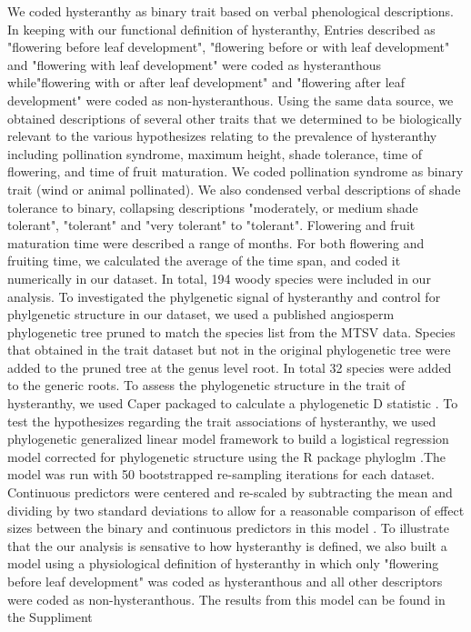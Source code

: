 \documentclass{article}\usepackage[]{graphicx}\usepackage[]{color}
\begin{document}
We coded hysteranthy as binary trait based on verbal phenological descriptions. In keeping with our functional definition of hysteranthy, Entries described as "flowering before leaf development", "flowering before or with leaf development" and "flowering with leaf development" were coded as hysteranthous while"flowering with or after leaf development" and "flowering after leaf development" were coded as non-hysteranthous. Using the same data source, we obtained descriptions of several other traits that we determined to be biologically relevant to the various hypothesizes relating to the prevalence of hysteranthy including pollination syndrome, maximum height, shade tolerance, time of flowering, and time of fruit maturation. We coded pollination syndrome as binary trait (wind or animal pollinated). We also condensed verbal descriptions of shade tolerance to binary, collapsing descriptions "moderately, or medium shade tolerant", "tolerant" and "very tolerant" to "tolerant". Flowering and fruit maturation time were described a range of months. For both flowering and fruiting time, we calculated the average of the time span, and coded it numerically in our dataset. In total, 194 woody species were included in our analysis. To investigated the phylgenetic signal of hysteranthy and control for phylgenetic structure in our dataset, we used a published angiosperm phylogenetic tree \citep{Zanne2014} pruned to match the species list from the MTSV data. Species that obtained in the trait dataset but not in the original phylogenetic tree were added to the pruned tree at the genus level root. In total 32 species were added to the generic roots. To assess the phylogenetic structure in the trait of hysteranthy, we used Caper packaged \citep{} to calculate a phylogenetic D statistic \citep{Fritz2010}. To test the hypothesizes regarding the trait associations of hysteranthy, we used phylogenetic generalized linear model framework \citep{Ives2010} to build a logistical regression model corrected for phylogenetic structure using the R package phyloglm \citep{}.The model was run with 50 bootstrapped re-sampling iterations for each dataset. Continuous predictors were centered and re-scaled by subtracting the mean and dividing by two standard deviations to allow for a reasonable comparison of effect sizes between the binary and continuous predictors in this model \citep{Gelman}.
 To illustrate that the our analysis is sensative to how hysteranthy is defined, we also built a model using a physiological definition of hysteranthy in which only "flowering before leaf development" was coded as hysteranthous and all other descriptors were coded as non-hysteranthous. The results from this model can be found in the Suppliment\\
\end{document}
